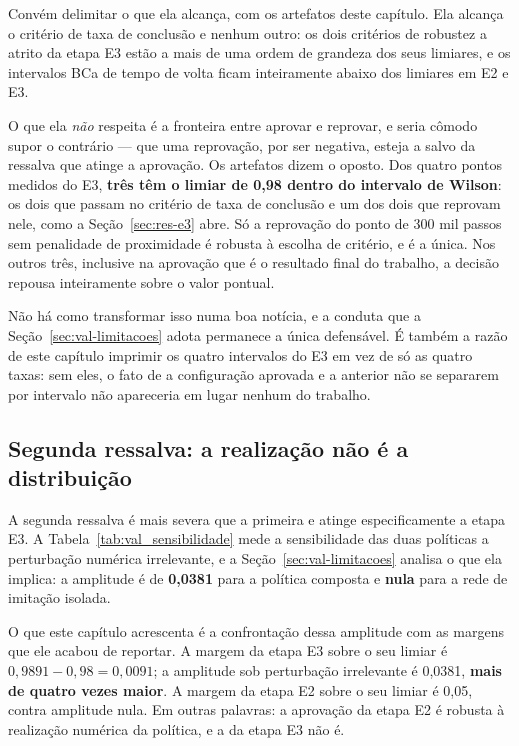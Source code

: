Convém delimitar o que ela alcança, com os artefatos deste capítulo. Ela alcança
o critério de taxa de conclusão e nenhum outro: os dois critérios de robustez a
atrito da etapa E3 estão a mais de uma ordem de grandeza dos seus limiares, e os
intervalos BCa de tempo de volta ficam inteiramente abaixo dos limiares em E2 e
E3.

O que ela \textit{não} respeita é a fronteira entre aprovar e reprovar, e seria
cômodo supor o contrário --- que uma reprovação, por ser negativa, esteja a salvo
da ressalva que atinge a aprovação. Os artefatos dizem o oposto. Dos quatro
pontos medidos do E3, \textbf{três têm o limiar de 0,98 dentro do intervalo de
Wilson}: os dois que passam no critério de taxa de conclusão e um dos dois que
reprovam nele, como a Seção~\ref{sec:res-e3} abre. Só a reprovação do ponto de 300 mil passos sem
penalidade de proximidade é robusta à escolha de critério, e é a única. Nos
outros três, inclusive na aprovação que é o resultado final do trabalho, a
decisão repousa inteiramente sobre o valor pontual.

Não há como transformar isso numa boa notícia, e a conduta que a
Seção~\ref{sec:val-limitacoes} adota permanece a única defensável. É também a
razão de este capítulo imprimir os quatro intervalos do E3 em vez de só as
quatro taxas: sem eles, o fato de a configuração aprovada e a anterior não se
separarem por intervalo não apareceria em lugar nenhum do trabalho.

\subsection{Segunda ressalva: a realização não é a distribuição}

A segunda ressalva é mais severa que a primeira e atinge especificamente a etapa
E3. A Tabela~\ref{tab:val_sensibilidade} mede a sensibilidade das duas políticas
a perturbação numérica irrelevante, e a Seção~\ref{sec:val-limitacoes} analisa o
que ela implica: a amplitude é de \textbf{0,0381} para a política composta e
\textbf{nula} para a rede de imitação isolada.

O que este capítulo acrescenta é a confrontação dessa amplitude com as margens
que ele acabou de reportar. A margem da etapa E3 sobre o seu limiar é
$0{,}9891 - 0{,}98 = 0{,}0091$; a amplitude sob perturbação irrelevante é
0,0381, \textbf{mais de quatro vezes maior}. A margem da etapa E2 sobre o seu
limiar é 0,05, contra amplitude nula. Em outras palavras: a aprovação da etapa E2
é robusta à realização numérica da política, e a da etapa E3 não é.

